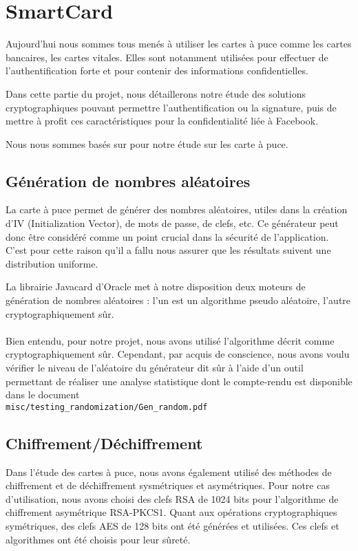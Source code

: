 \documentclass[a4paper,11pt,french]{article}
\begin{document}
\section{SmartCard}
Aujourd'hui nous sommes tous menés à utiliser les cartes à puce comme les cartes
bancaires, les cartes vitales. Elles sont notamment utilisées pour effectuer de 
l'authentification forte et pour contenir des informations confidentielles.

Dans cette partie du projet, nous détaillerons notre étude des solutions 
cryptographiques pouvant permettre l'authentification ou la signature, puis de 
mettre à profit ces caractéristiques pour la confidentialité liée à Facebook.

Nous nous sommes basés sur \cite{LinuxMag}  pour notre étude sur les carte à puce.


\subsection{Génération de nombres aléatoires}
La carte à puce permet de générer des nombres aléatoires, utiles dans la création
d'IV (Initialization Vector), de mots de passe, de clefs, etc. Ce générateur 
peut donc être considéré comme un point crucial dans la sécurité de l'application.
C'est pour cette raison qu'il a fallu nous assurer que les résultats suivent une
distribution uniforme. 

La librairie Javacard d'Oracle met à notre disposition deux moteurs de génération
de nombres aléatoires : l'un est un algorithme pseudo aléatoire, l'autre 
cryptographiquement sûr.

\paragraph{}
Bien entendu, pour notre projet, nous avons utilisé l'algorithme décrit comme 
\og{}cryptographiquement sûr\fg{}. Cependant, par acquis de conscience, nous avons voulu
vérifier le niveau de l'aléatoire du générateur dit sûr à l'aide d'un
outil permettant de réaliser une analyse statistique dont le compte-rendu
est disponible dans le document\\ 
\texttt{misc/testing\_randomization/Gen\_random.pdf}

\subsection{Chiffrement/Déchiffrement}
Dans l'étude des cartes à puce, nous avons également utilisé des méthodes de 
chiffrement et de déchiffrement sysmétriques et asymétriques. Pour notre cas 
d'utilisation, nous avons choisi des clefs RSA de 1024 bits pour l'algorithme de
chiffrement asymétrique RSA-PKCS1. Quant aux opérations cryptographiques 
symétriques, des clefs AES de 128 bits ont été générées et utilisées. Ces clefs
et algorithmes ont été choisis pour leur sûreté.
\end{document}
